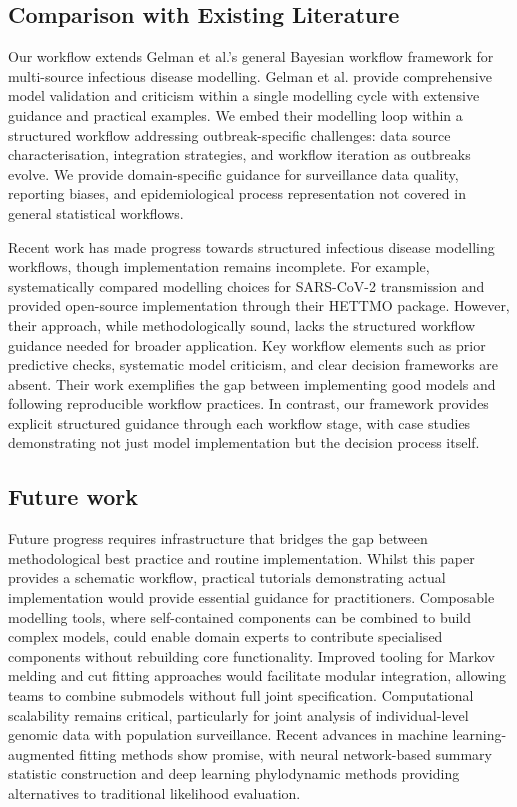 \documentclass{article}
\begin{document}
\subsection{Comparison with Existing Literature}

 Our workflow extends Gelman et al.'s general Bayesian workflow framework \citep{gelman2020bayesian} for multi-source infectious disease modelling.
 Gelman et al. provide comprehensive model validation and criticism within a single modelling cycle with extensive guidance and practical examples.
 We embed their modelling  loop within a structured workflow addressing outbreak-specific challenges: data source characterisation, integration strategies, and workflow iteration as outbreaks evolve. We provide domain-specific guidance for surveillance data quality, reporting biases, and epidemiological process representation not covered in general statistical workflows.
 
Recent work has made progress towards structured infectious disease modelling workflows, though implementation remains incomplete.
For example, \citet{bouman2024bayesian} systematically compared modelling choices for SARS-CoV-2 transmission and provided open-source implementation through their HETTMO package.
However, their approach, while methodologically sound, lacks the structured workflow guidance needed for broader application.
Key workflow elements such as prior predictive checks, systematic model criticism, and clear decision frameworks are absent.
Their work exemplifies the gap between implementing good models and following reproducible workflow practices.
In contrast, our framework provides explicit structured guidance through each workflow stage, with case studies demonstrating not just model implementation but the decision process itself.

\subsection{Future work}

Future progress requires infrastructure that bridges the gap between methodological best practice and routine implementation.
Whilst this paper provides a schematic workflow, practical tutorials demonstrating actual implementation would provide essential guidance for practitioners.
Composable modelling tools, where self-contained components can be combined to build complex models, could enable domain experts to contribute specialised components without rebuilding core functionality.
Improved tooling for Markov melding and cut fitting approaches would facilitate modular integration, allowing teams to combine submodels without full joint specification.
Computational scalability remains critical, particularly for joint analysis of individual-level genomic data with population surveillance.
Recent advances in machine learning-augmented fitting methods show promise, with neural network-based summary statistic construction \citep{raynal2019abc} and deep learning phylodynamic methods \citep{voznica2022deep} providing alternatives to traditional likelihood evaluation.
\end{document}
